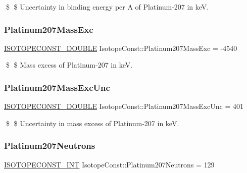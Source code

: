 \$ \$ Uncertainty in binding energy per A of Platinum-\/207 in keV. \mbox{\label{group___isotope_const-_platinum-_pt207_ga3579b7a48842b27090b268aae1ef423c}} 
\subsubsection{\texorpdfstring{Platinum207\+Mass\+Exc}{Platinum207MassExc}}
{\footnotesize\ttfamily \mbox{\hyperlink{group___isotope_const-_macros_ga8f45a7272ce02c0b4c65c44636ed719a}{I\+S\+O\+T\+O\+P\+E\+C\+O\+N\+S\+T\+\_\+\+D\+O\+U\+B\+LE}} Isotope\+Const\+::\+Platinum207\+Mass\+Exc = -\/4540}

\$ \$ Mass excess of Platinum-\/207 in keV. \mbox{\label{group___isotope_const-_platinum-_pt207_gadaca33d846ce71ff479b9107394f4dfd}} 
\subsubsection{\texorpdfstring{Platinum207\+Mass\+Exc\+Unc}{Platinum207MassExcUnc}}
{\footnotesize\ttfamily \mbox{\hyperlink{group___isotope_const-_macros_ga8f45a7272ce02c0b4c65c44636ed719a}{I\+S\+O\+T\+O\+P\+E\+C\+O\+N\+S\+T\+\_\+\+D\+O\+U\+B\+LE}} Isotope\+Const\+::\+Platinum207\+Mass\+Exc\+Unc = 401}

\$ \$ Uncertainty in mass excess of Platinum-\/207 in keV. \mbox{\label{group___isotope_const-_platinum-_pt207_ga9bfa83021026d672b0be7d14aba1c92c}} 
\subsubsection{\texorpdfstring{Platinum207\+Neutrons}{Platinum207Neutrons}}
{\footnotesize\ttfamily \mbox{\hyperlink{group___isotope_const-_macros_ga5f18360b3e99483a35c32d789e62621c}{I\+S\+O\+T\+O\+P\+E\+C\+O\+N\+S\+T\+\_\+\+I\+NT}} Isotope\+Const\+::\+Platinum207\+Neutrons = 129}

